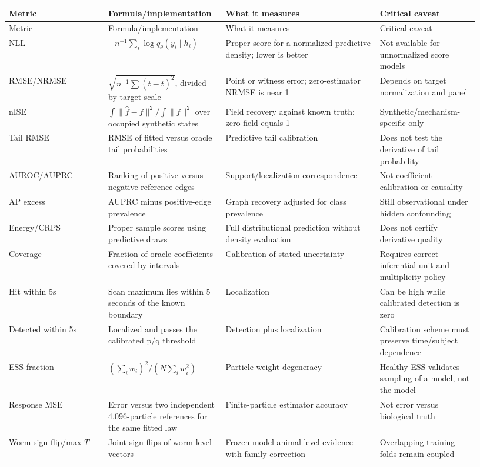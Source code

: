 \documentclass[10pt]{article}
\begin{document}
\begin{longtable}{L{0.20\linewidth}L{0.22\linewidth}L{0.31\linewidth}L{0.20\linewidth}}
\toprule
Metric & Formula/implementation & What it measures & Critical caveat \\
\midrule
\endfirsthead
\toprule Metric & Formula/implementation & What it measures & Critical caveat \\
\midrule\endhead
NLL & $-n^{-1}\sum_i\log q_\theta(y_i\mid h_i)$ & Proper score for a normalized predictive density; lower is better & Not available for unnormalized score models \\
RMSE/NRMSE & $\sqrt{n^{-1}\sum(\hat t-t)^2}$, divided by target scale & Point or witness error; zero-estimator NRMSE is near 1 & Depends on target normalization and panel \\
nISE & $\int\|\hat f-f\|^2/\int\|f\|^2$ over occupied synthetic states & Field recovery against known truth; zero field equals 1 & Synthetic/mechanism-specific only \\
Tail RMSE & RMSE of fitted versus oracle tail probabilities & Predictive tail calibration & Does not test the derivative of tail probability \\
AUROC/AUPRC & Ranking of positive versus negative reference edges & Support/localization correspondence & Not coefficient calibration or causality \\
AP excess & AUPRC minus positive-edge prevalence & Graph recovery adjusted for class prevalence & Still observational under hidden confounding \\
Energy/CRPS & Proper sample scores using predictive draws & Full distributional prediction without density evaluation & Does not certify derivative quality \\
Coverage & Fraction of oracle coefficients covered by intervals & Calibration of stated uncertainty & Requires correct inferential unit and multiplicity policy \\
Hit within 5s & Scan maximum lies within 5 seconds of the known boundary & Localization & Can be high while calibrated detection is zero \\
Detected within 5s & Localized and passes the calibrated p/q threshold & Detection plus localization & Calibration scheme must preserve time/subject dependence \\
ESS fraction & $(\sum_iw_i)^2/(N\sum_iw_i^2)$ & Particle-weight degeneracy & Healthy ESS validates sampling of a model, not the model \\
Response MSE & Error versus two independent 4,096-particle references for the same fitted law & Finite-particle estimator accuracy & Not error versus biological truth \\
Worm sign-flip/max-$T$ & Joint sign flips of worm-level vectors & Frozen-model animal-level evidence with family correction & Overlapping training folds remain coupled \\
\bottomrule
\end{longtable}
\end{document}
